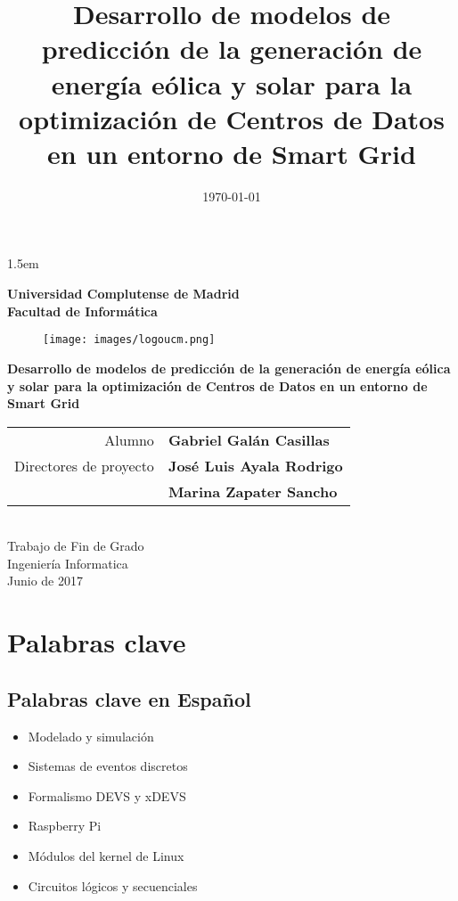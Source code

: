 \documentclass[a4paper,11pt]{book}
\title{Desarrollo de modelos de predicción de la generación de energía eólica y solar para la optimización de Centros de Datos en un entorno de Smart Grid}
\author{\myauthor}
\date{\today}
\newcommand\mytitle{Desarrollo de modelos de predicción de la generación de energía eólica y solar para la optimización de Centros de Datos en un entorno de Smart Grid}
\newcommand\myauthor{Gabriel Galán Casillas}
\newcommand\myadvisorA{José Luis Ayala Rodrigo}
\newcommand\myadvisorB{Marina Zapater Sancho}
\newcommand\mydegree{Ingeniería Informatica}
\newcommand\myyear{2017}
\begin{document}
\baselineskip 1.5em     %

\titlepage{}
\setlength{\unitlength}{1 cm} %

\begin{center}
\textbf{{\LARGE Universidad Complutense de Madrid}\\[0.5cm]}
\textbf{
{\Large Facultad de Informática}}\\[0.5cm]
\begin{figure}[!ht]
\begin{center}
\texttt{[image: images/logoucm.png]}\\[1cm]
\end{center}
\end{figure}


\textbf{\LARGE \mytitle}\\[4cm]
\begin{tabular}{r l}
\Large Alumno	& \Large \textbf{\myauthor}	\\[0.3cm]
\Large Directores de proyecto	& \Large  \textbf{\myadvisorA} \\	
                            & \Large  \textbf{\myadvisorB}
\end{tabular}\\[4cm]
{\large Trabajo de Fin de Grado}\\[0.3cm]
{\large \mydegree}\\[0.3cm]
{\large Junio de \myyear}
\end{center}



\tableofcontents

\chapter*{Palabras clave}

\section*{Palabras clave en Español}
\begin{itemize}
\item Modelado y simulación
\item Sistemas de eventos discretos
\item Formalismo DEVS y xDEVS
\item Raspberry Pi
\item Módulos del kernel de Linux
\item Circuitos lógicos y secuenciales
\end{itemize}
\end{document}
